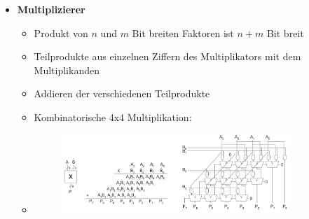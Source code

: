 \documentclass[11pt,a4paper]{article}
\begin{document}
\begin{itemize}
\item \textbf{Multiplizierer}
	\begin{itemize}
	\item Produkt von $n$ und $m$ Bit breiten Faktoren ist $n+m$ Bit breit
	\item Teilprodukte aus einzelnen Ziffern des Multiplikators mit dem Multiplikanden
	\item Addieren der verschiedenen Teilprodukte
	\item Kombinatorische 4x4 Multiplikation:
	\item[]
		\begin{figure}[H]
		\begin{center}
		\includegraphics[height=3cm]{multiplikation}
		\end{center}
		\end{figure}
	\end{itemize}
\end{itemize}
\end{document}
